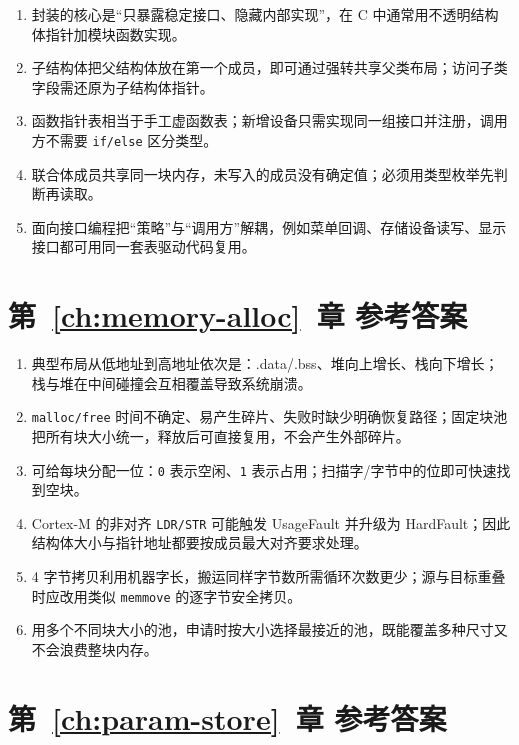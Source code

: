\begin{enumerate}
	\item 封装的核心是“只暴露稳定接口、隐藏内部实现”，在 C 中通常用不透明结构体指针加模块函数实现。
	\item 子结构体把父结构体放在第一个成员，即可通过强转共享父类布局；访问子类字段需还原为子结构体指针。
	\item 函数指针表相当于手工虚函数表；新增设备只需实现同一组接口并注册，调用方不需要 \texttt{if/else} 区分类型。
	\item 联合体成员共享同一块内存，未写入的成员没有确定值；必须用类型枚举先判断再读取。
	\item 面向接口编程把“策略”与“调用方”解耦，例如菜单回调、存储设备读写、显示接口都可用同一套表驱动代码复用。
\end{enumerate}

\section*{第~\ref{ch:memory-alloc}~章 参考答案}

\begin{enumerate}
	\item 典型布局从低地址到高地址依次是：.data/.bss、堆向上增长、栈向下增长；栈与堆在中间碰撞会互相覆盖导致系统崩溃。
	\item \texttt{malloc/free} 时间不确定、易产生碎片、失败时缺少明确恢复路径；固定块池把所有块大小统一，释放后可直接复用，不会产生外部碎片。
	\item 可给每块分配一位：\texttt{0} 表示空闲、\texttt{1} 表示占用；扫描字/字节中的位即可快速找到空块。
	\item Cortex-M 的非对齐 \texttt{LDR/STR} 可能触发 UsageFault 并升级为 HardFault；因此结构体大小与指针地址都要按成员最大对齐要求处理。
	\item 4 字节拷贝利用机器字长，搬运同样字节数所需循环次数更少；源与目标重叠时应改用类似 \texttt{memmove} 的逐字节安全拷贝。
	\item 用多个不同块大小的池，申请时按大小选择最接近的池，既能覆盖多种尺寸又不会浪费整块内存。
\end{enumerate}

\section*{第~\ref{ch:param-store}~章 参考答案}

